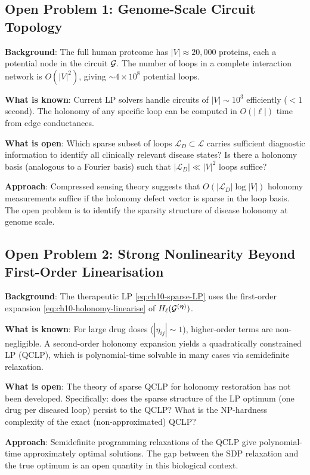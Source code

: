 \subsection{Open Problem 1: Genome-Scale Circuit Topology}

\textbf{Background}: The full human proteome has $|V| \approx 20{,}000$ proteins,
each a potential node in the circuit $\mathcal{G}$.  The number of loops in a
complete interaction network is $O(|V|^2)$, giving $\sim 4 \times 10^8$
potential loops.

\textbf{What is known}: Current LP solvers handle circuits of $|V| \sim 10^3$
efficiently ($< 1$ second).  The holonomy of any specific loop can be computed
in $O(|\ell|)$ time from edge conductances.

\textbf{What is open}: Which sparse subset of loops $\mathcal{L}_D \subset
\mathcal{L}$ carries sufficient diagnostic information to identify all
clinically relevant disease states?  Is there a holonomy basis (analogous to
a Fourier basis) such that $|\mathcal{L}_D| \ll |V|^2$ loops suffice?

\textbf{Approach}: Compressed sensing theory \citep{Tibshirani1996} suggests
that $O(|\mathcal{L}_D| \log |V|)$ holonomy measurements suffice if the
holonomy defect vector is sparse in the loop basis.  The open problem is to
identify the sparsity structure of disease holonomy at genome scale.

\subsection{Open Problem 2: Strong Nonlinearity Beyond First-Order Linearisation}

\textbf{Background}: The therapeutic LP \eqref{eq:ch10-sparse-LP} uses the
first-order expansion \eqref{eq:ch10-holonomy-linearise} of
$H_\ell(\mathcal{G}^{(\boldsymbol{\eta})})$.

\textbf{What is known}: For large drug doses ($|\eta_{ij}| \sim 1$), higher-order
terms are non-negligible.  A second-order holonomy expansion yields a
quadratically constrained LP (QCLP), which is polynomial-time solvable in
many cases via semidefinite relaxation.

\textbf{What is open}: The theory of sparse QCLP for holonomy restoration has
not been developed.  Specifically: does the sparse structure of the LP optimum
(one drug per diseased loop) persist to the QCLP?  What is the NP-hardness
complexity of the exact (non-approximated) QCLP?

\textbf{Approach}: Semidefinite programming relaxations of the QCLP give
polynomial-time approximately optimal solutions.  The gap between the SDP
relaxation and the true optimum is an open quantity in this biological context.

